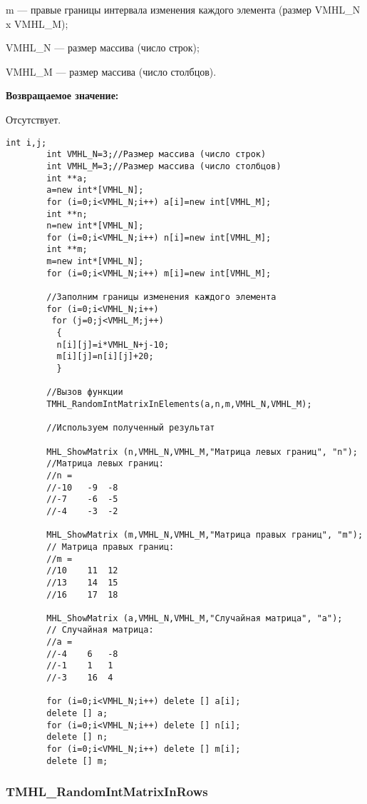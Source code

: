 \documentclass[a4paper,12pt]{article}
\begin{document}
m --- правые границы интервала изменения каждого элемента (размер VMHL\_N x VMHL\_M);
 
VMHL\_N --- размер массива (число строк);
 
VMHL\_M --- размер массива (число столбцов).

\textbf{Возвращаемое значение:}

Отсутствует.


\begin{lstlisting}[label=code_use_TMHL_RandomIntMatrixInElements,caption=Пример использования]
        int i,j;
        int VMHL_N=3;//Размер массива (число строк)
        int VMHL_M=3;//Размер массива (число столбцов)
        int **a;
        a=new int*[VMHL_N];
        for (i=0;i<VMHL_N;i++) a[i]=new int[VMHL_M];
        int **n;
        n=new int*[VMHL_N];
        for (i=0;i<VMHL_N;i++) n[i]=new int[VMHL_M];
        int **m;
        m=new int*[VMHL_N];
        for (i=0;i<VMHL_N;i++) m[i]=new int[VMHL_M];

        //Заполним границы изменения каждого элемента
        for (i=0;i<VMHL_N;i++)
         for (j=0;j<VMHL_M;j++)
          {
          n[i][j]=i*VMHL_N+j-10;
          m[i][j]=n[i][j]+20;
          }

        //Вызов функции
        TMHL_RandomIntMatrixInElements(a,n,m,VMHL_N,VMHL_M);

        //Используем полученный результат

        MHL_ShowMatrix (n,VMHL_N,VMHL_M,"Матрица левых границ", "n");
        //Матрица левых границ:
        //n =
        //-10	-9	-8
        //-7	-6	-5
        //-4	-3	-2

        MHL_ShowMatrix (m,VMHL_N,VMHL_M,"Матрица правых границ", "m");
        // Матрица правых границ:
        //m =
        //10	11	12
        //13	14	15
        //16	17	18

        MHL_ShowMatrix (a,VMHL_N,VMHL_M,"Случайная матрица", "a");
        // Случайная матрица:
        //a =
        //-4	6	-8
        //-1	1	1
        //-3	16	4

        for (i=0;i<VMHL_N;i++) delete [] a[i];
        delete [] a;
        for (i=0;i<VMHL_N;i++) delete [] n[i];
        delete [] n;
        for (i=0;i<VMHL_N;i++) delete [] m[i];
        delete [] m;
\end{lstlisting}

\subsubsection{TMHL\_RandomIntMatrixInRows}\label{TMHL_RandomIntMatrixInRows}
\end{document}
